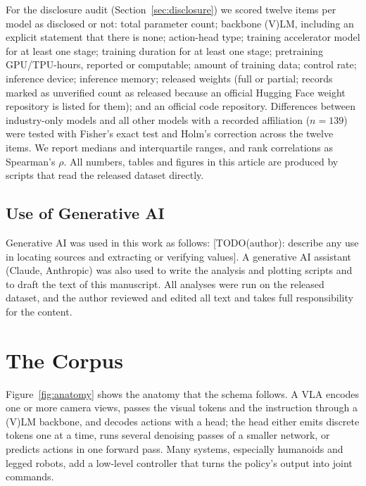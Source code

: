 \documentclass[applsci,review,submit,pdftex,oneauthor]{Definitions/mdpi}
\begin{document}
For the disclosure audit (Section~\ref{sec:disclosure}) we scored twelve items per model as disclosed or not: total parameter count; backbone (V)LM, including an explicit statement that there is none; action-head type; training accelerator model for at least one stage; training duration for at least one stage; pretraining GPU/TPU-hours, reported or computable; amount of training data; control rate; inference device; inference memory; released weights (full or partial; \nOpenHF{} records marked as unverified count as released because an official Hugging Face weight repository is listed for them); and an official code repository. Differences between industry-only models and all other models with a recorded affiliation ($n=139$) were tested with Fisher's exact test and Holm's correction across the twelve items. We report medians and interquartile ranges, and rank correlations as Spearman's $\rho$. All numbers, tables and figures in this article are produced by scripts that read the released dataset directly.

\subsection{Use of Generative AI}

Generative AI was used in this work as follows: [TODO(author): describe any use in locating sources and extracting or verifying values]. A generative AI assistant (Claude, Anthropic) was also used to write the analysis and plotting scripts and to draft the text of this manuscript. All analyses were run on the released dataset, and the author reviewed and edited all text and takes full responsibility for the content.

\section{The Corpus}\label{sec:corpus}

Figure~\ref{fig:anatomy} shows the anatomy that the schema follows. A VLA encodes one or more camera views, passes the visual tokens and the instruction through a (V)LM backbone, and decodes actions with a head; the head either emits discrete tokens one at a time, runs several denoising passes of a smaller network, or predicts actions in one forward pass. Many systems, especially humanoids and legged robots, add a low-level controller that turns the policy's output into joint commands.
\end{document}
